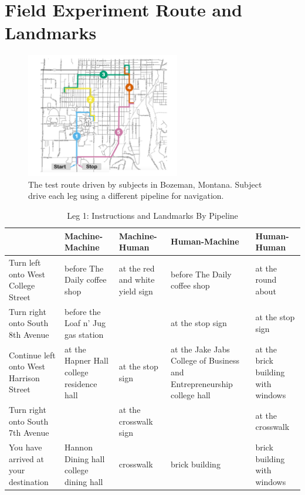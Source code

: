 \chapter{Field Experiment Route and Landmarks}\label{appendix:route}

\begin{figure}[htbp]
  \centering
  \includegraphics[width=0.6\textwidth]{images/route.pdf}
  \caption{The test route driven by subjects in Bozeman, Montana. Subject drive each leg using a different pipeline for navigation.}
  \label{fig:routeAppendix}
\end{figure}

\begin{table}[htbp]
  \centering
  \caption{Leg 1: Instructions and Landmarks By Pipeline}
  \label{tab:route:1}
  {\tabulinesep=2mm
    \begin{singlespace}
    \begin{tabu} to \textwidth{|X[c]||X[c]|X[c]|X[c]|X[c]|}
    \hline
        & Machine-Machine & Machine-Human & Human-Machine & Human-Human \\
        \hline\hline
          Turn left onto West College Street & before The Daily coffee shop  & at the red and white yield sign & before The Daily coffee shop & at the round about \\
          \hline
          Turn right onto South 8th Avenue & before the Loaf n' Jug gas station & & at the stop sign
          & at the stop sign \\
          \hline
          Continue left onto West Harrison Street & at the Hapner Hall college residence hall & at the stop sign & at the Jake Jabs College of Business and Entrepreneurship college hall & at the brick building with windows \\
          \hline
          Turn right onto South 7th Avenue & & at the crosswalk sign & & at the crosswalk \\
          \hline
          You have arrived at your destination & Hannon Dining hall college dining hall & crosswalk & brick building & brick building with windows \\
    \hline
    \end{tabu}
    \end{singlespace}
    }
\end{table}